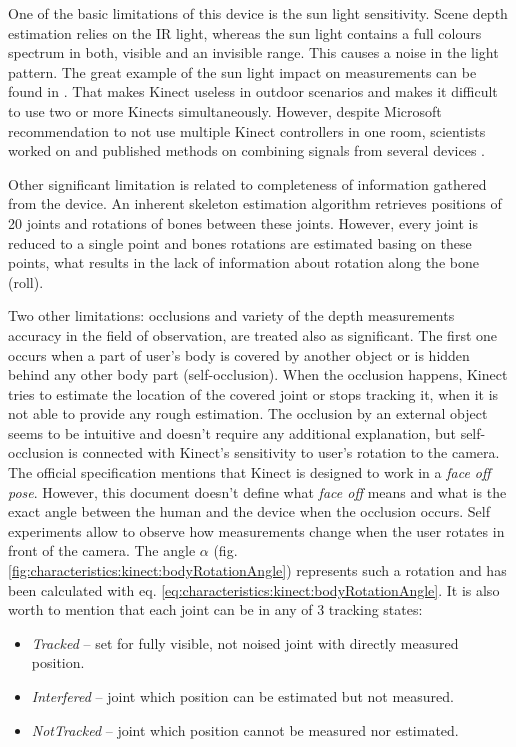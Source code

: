 \documentclass{llncs}
\begin{document}
		
One of the basic limitations of this device is the sun light sensitivity. Scene depth estimation relies on the IR light, whereas the sun light contains a full colours spectrum in both, visible and an invisible range. This causes a noise in the light pattern. The great example of the sun light impact on measurements can be found in \cite{Suarez2012}. That makes Kinect useless in outdoor scenarios and makes it difficult to use two or more Kinects simultaneously. However, despite Microsoft recommendation to not use multiple Kinect controllers in one room, scientists worked on and published methods on combining signals from several devices \cite{Kitsikidis2011,Asteriadis2013,Schroder2011}.

Other significant limitation is related to completeness of information gathered from the device. An inherent skeleton estimation algorithm retrieves positions of 20 joints and rotations of bones between these joints. However, every joint is reduced to a single point and bones rotations are estimated basing on these points, what results in the lack of information about rotation along the bone (roll).

Two other limitations: occlusions and variety of the depth measurements accuracy in the field of observation, are treated also as significant. The first one occurs when a part of user's body is covered by another object or is hidden behind any other body part (self-occlusion). When the occlusion happens, Kinect tries to estimate the location of the covered joint or stops tracking it, when it is not able to provide any rough estimation. The occlusion by an external object seems to be intuitive and doesn't require any additional explanation, but self-occlusion is connected with Kinect's sensitivity to user's rotation to the camera. The official specification mentions that Kinect is designed to work in a \textit{face off pose}. However, this document doesn't define what \textit{face off} means and what is the exact angle between the human and the device when the occlusion occurs. Self experiments allow to observe how measurements change when the user rotates in front of the camera. The angle $\alpha$ (fig. \ref{fig:characteristics:kinect:bodyRotationAngle}) represents such a rotation and has been calculated with eq. \eqref{eq:characteristics:kinect:bodyRotationAngle}. It is also worth to mention that each joint can be in any of 3 tracking states:
\begin{itemize}
	\item \textsl{Tracked} -- set for fully visible, not noised joint with directly measured position.
	\item \textsl{Interfered} -- joint which position can be estimated but not measured.
	\item \textsl{NotTracked} -- joint which position cannot be measured nor estimated.
\end{itemize}
\end{document}

